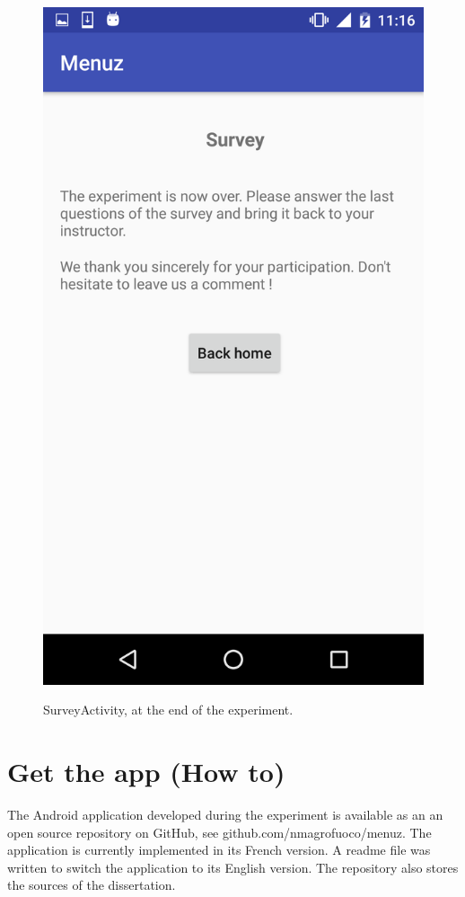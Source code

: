 \begin{figure}[!ht]
  \begin{center}
    \includegraphics[scale=0.22]{img/survey_activityb.png}
    \label{fig:survey_activityb}
    \caption{SurveyActivity, at the end of the experiment.}
  \end{center}
\end{figure}

\newpage

\chapter{Get the app (How to)}
The Android application developed during the experiment is available as an 
an open source repository on GitHub, see github.com/nmagrofuoco/menuz. The 
application is currently implemented in its French version. A readme file was 
written to switch the application to its English version. The repository also 
stores the sources of the dissertation.